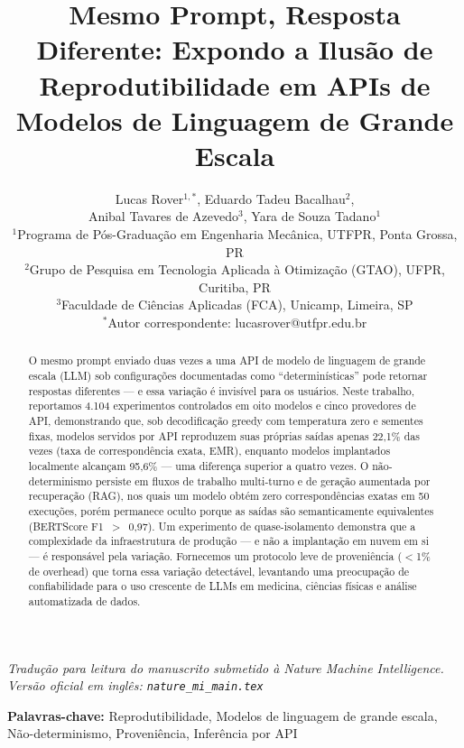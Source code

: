 \documentclass[12pt,a4paper]{article}
\title{\textbf{Mesmo Prompt, Resposta Diferente: Expondo a Ilusão de Reprodutibilidade em APIs de Modelos de Linguagem de Grande Escala}}
\author{Lucas Rover$^{1,*}$, Eduardo Tadeu Bacalhau$^{2}$,\\
Anibal Tavares de Azevedo$^{3}$, Yara de Souza Tadano$^{1}$\\[6pt]
\small $^{1}$Programa de Pós-Graduação em Engenharia Mecânica, UTFPR, Ponta Grossa, PR\\
\small $^{2}$Grupo de Pesquisa em Tecnologia Aplicada à Otimização (GTAO), UFPR, Curitiba, PR\\
\small $^{3}$Faculdade de Ciências Aplicadas (FCA), Unicamp, Limeira, SP\\[4pt]
\small $^{*}$Autor correspondente: lucasrover@utfpr.edu.br}
\date{}
\begin{document}
\maketitle

\begin{center}
\textit{Tradução para leitura do manuscrito submetido à Nature Machine Intelligence.\\
Versão oficial em inglês: \texttt{nature\_mi\_main.tex}}
\end{center}

\vspace{1em}

\begin{abstract}
\noindent O mesmo prompt enviado duas vezes a uma API de modelo de linguagem de grande escala (LLM) sob configurações documentadas como ``determinísticas'' pode retornar respostas diferentes --- e essa variação é invisível para os usuários.
Neste trabalho, reportamos 4.104 experimentos controlados em oito modelos e cinco provedores de API, demonstrando que, sob decodificação greedy com temperatura zero e sementes fixas, modelos servidos por API reproduzem suas próprias saídas apenas 22,1\% das vezes (taxa de correspondência exata, EMR), enquanto modelos implantados localmente alcançam 95,6\% --- uma diferença superior a quatro vezes.
O não-determinismo persiste em fluxos de trabalho multi-turno e de geração aumentada por recuperação (RAG), nos quais um modelo obtém zero correspondências exatas em 50 execuções, porém permanece oculto porque as saídas são semanticamente equivalentes (BERTScore F1~$>$~0,97).
Um experimento de quase-isolamento demonstra que a complexidade da infraestrutura de produção --- e não a implantação em nuvem em si --- é responsável pela variação.
Fornecemos um protocolo leve de proveniência ($<$1\% de overhead) que torna essa variação detectável, levantando uma preocupação de confiabilidade para o uso crescente de LLMs em medicina, ciências físicas e análise automatizada de dados.
\end{abstract}

\textbf{Palavras-chave:} Reprodutibilidade, Modelos de linguagem de grande escala, Não-determinismo, Proveniência, Inferência por API

\vspace{1.5em}

\end{document}
